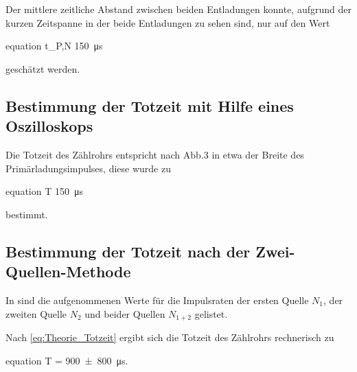 	Der mittlere zeitliche Abstand zwischen beiden Entladungen konnte, aufgrund der kurzen Zeitspanne 
	in der beide Entladungen zu sehen sind, nur auf den Wert
	\begin{empheq}{equation}
		\Delta t_{P,N} \approx \SI{150}{\micro\second}
	\end{empheq} 
	geschätzt werden.
	 

\subsection{Bestimmung der Totzeit mit Hilfe eines Oszilloskops}

	Die Totzeit des Zählrohrs entspricht nach Abb.3 \cite{V703} in etwa der 
	Breite des Primärladungsimpulses, diese wurde zu
	\begin{empheq}{equation}
		T \approx \SI{150}{\micro\second}
	\end{empheq} 
	bestimmt.
	

\subsection{Bestimmung der Totzeit nach der Zwei-Quellen-Methode}

	In sind die aufgenommenen Werte für die Impulsraten der ersten Quelle
	$N_{1}$, der zweiten Quelle $N_{2}$ und beider Quellen $N_{1+2}$ gelistet.
	
%	

	Nach \cref{eq:Theorie_Totzeit} ergibt sich die Totzeit des Zählrohrs 
	rechnerisch zu 
	\begin{empheq}{equation}
		T = \SI{900(800)}{\micro\second}.
	\end{empheq}	
	
	
